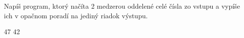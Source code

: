 




Napíš program, ktorý načíta 2 medzerou oddelené celé čísla zo vstupu a vypíše ich v opačnom poradí na jediný riadok výstupu.

 47
 42
\koniec


